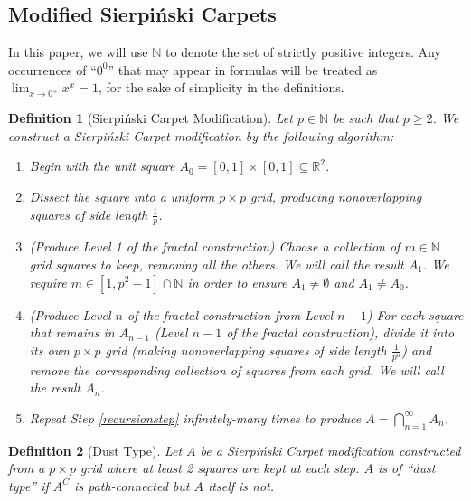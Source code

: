 \documentclass{article}
\theoremstyle{plain}
\newtheorem{definition}{Definition}
\numberwithin{equation}{section}
\numberwithin{table}{section}
\numberwithin{figure}{section}
\begin{document}
\subsection{Modified Sierpi\'nski Carpets} \label{chap:dustdefinitions}
In this paper, we will use $\mathbb{N}$ to denote the set of strictly positive integers. Any occurrences of ``$0^0$'' that may appear in formulas will be treated as $\displaystyle \lim_{x\rightarrow 0^+} x^x = 1$, for the sake of simplicity in the definitions. \\

\begin{definition}[Sierpi\'nski Carpet Modification] \label{def:sierpinskicarpetmodification}
Let $p \in \mathbb{N}$ be such that $p \geq 2$. We construct a \textit{Sierpi\'nski Carpet modification} by the following algorithm:
\begin{enumerate}
    \item Begin with the unit square $A_0 = [0,1] \times [0,1] \subseteq \mathbb{R}^2$.
    \item Dissect the square into a uniform $p \times p$ grid, producing nonoverlapping squares of side length $\frac{1}{p}$.
    \item (Produce Level 1 of the fractal construction) Choose a collection of $m \in \mathbb{N}$ grid squares to keep, removing all the others. We will call the result $A_1$. We require $m \in [1,p^2-1] \cap \mathbb{N}$ in order to ensure $A_1 \neq \emptyset$ and $A_1 \neq A_0$.
    \item (Produce Level $n$ of the fractal construction from Level $n-1$) For each square that remains in $A_{n-1}$ (Level $n-1$ of the fractal construction), divide it into its own $p \times p$ grid (making nonoverlapping squares of side length $\frac{1}{p^n}$) and remove the corresponding collection of squares from each grid. We will call the result $A_n$. \label{recursionstep}
    \item Repeat Step \ref{recursionstep} infinitely-many times to produce $\displaystyle A = \bigcap_{n=1}^{\infty} A_n$.
\end{enumerate}
\end{definition}

\begin{definition}[Dust Type] \label{def:dusttype}
Let $A$ be a Sierpi\'nski Carpet modification constructed from a $p \times p$ grid where at least 2 squares are kept at each step. $A$ is of ``dust type'' if $A^C$ is path-connected but $A$ itself is not.
\end{definition}
\end{document}
